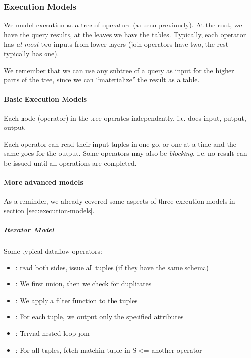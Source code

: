\subsubsection{Execution Models}
\label{sec:execution-models-advanced}
We model execution as a tree of operators (as seen previously). At the root, we have the query results, at the leaves we have the tables.
Typically, each operator has \textit{at most} two inputs from lower layers (join operators have two, the rest typically has one).

We remember that we can use any subtree of a query as input for the higher parts of the tree, since we can ``materialize'' the result as a table.


\paragraph{Basic Execution Models}
Each node (operator) in the tree operates independently, i.e. does input, putput, output.

Each operator can read their input tuples in one go, or one at a time and the same goes for the output.
Some operators may also be \textit{blocking}, i.e. no result can be issued until all operations are completed.


\paragraph{More advanced models}
As a reminder, we already covered some aspects of three execution models in section \ref{sec:execution-models}.


\subparagraph{Iterator Model}
Some typical dataflow operators:
\begin{itemize}
    \item {}: read both sides, issue all tuples (if they have the same schema)
    \item {}: We first union, then we check for duplicates
    \item {}: We apply a filter function to the tuples
    \item {}: For each tuple, we output only the specified attributes
    \item {}: Trivial nested loop join
    \item {}: For all tuples, fetch matchin tuple in S <= another operator
\end{itemize}

